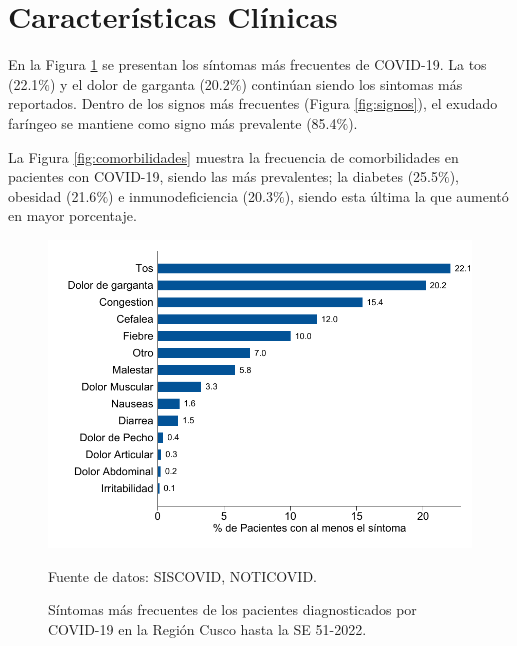 \documentclass[12pt,a4paper,openany]{book}
\begin{document}
	
	\cleardoublepage
	
	
	\clearpage

	
	\section*{Características Clínicas}
	\noindent En la Figura \ref{fig:sintomas} se presentan los síntomas más frecuentes de COVID-19. La tos (22.1$\%$) y el dolor de garganta (20.2$\%$) continúan siendo los sintomas más reportados. Dentro de los signos más frecuentes (Figura \ref{fig:signos}), el exudado faríngeo se mantiene como signo más prevalente (85.4$\%$). 
	
	\noindent La Figura \ref{fig:comorbilidades} muestra la frecuencia de comorbilidades en pacientes con COVID-19, siendo las más prevalentes; la diabetes (25.5$\%$), obesidad (21.6$\%$) e inmunodeficiencia (20.3$\%$), siendo esta última la que aumentó en mayor porcentaje.
	  
	 
	
	\begin{figure}[h]
		\caption{Síntomas más frecuentes de los pacientes diagnosticados por COVID-19 en la Región Cusco hasta la SE 51-2022.  }\label{fig:sintomas}
		\begin{center}
			\includegraphics[width=0.85\linewidth]{../figuras/figura_sintoma.pdf}
		\end{center}
		{\footnotesize {Fuente de datos: SISCOVID, NOTICOVID.}}
	\end{figure}
	
\end{document}
